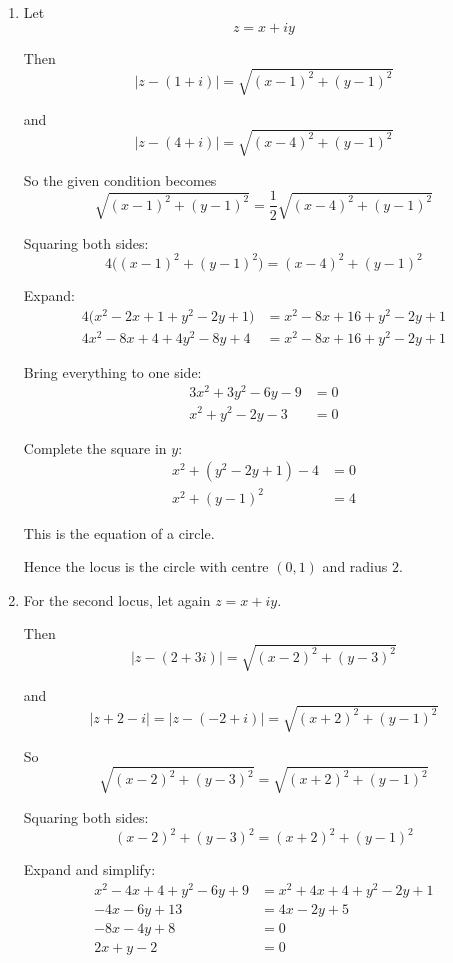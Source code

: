 \documentclass[leqno]{article}
\begin{document}
\begin{enumerate}[
  label=\textbf{\arabic*.},
  leftmargin=*,
  topsep=0pt,
  partopsep=0pt,
  parsep=0pt
]
\vspace*{10pt}

\begin{djsSolution}
\begin{enumerate}[label=\textbf{(\alph*)}]
  \item Let
  \[
  z=x+iy
  \]

  Then
  \[
  \lvert z-(1+i)\rvert=\sqrt{(x-1)^2+(y-1)^2}
  \]

  and
  \[
  \lvert z-(4+i)\rvert=\sqrt{(x-4)^2+(y-1)^2}
  \]

  So the given condition becomes
  \[
  \sqrt{(x-1)^2+(y-1)^2}=\frac12\sqrt{(x-4)^2+(y-1)^2}
  \]

  Squaring both sides:
  \[
  4\bigl((x-1)^2+(y-1)^2\bigr)=(x-4)^2+(y-1)^2
  \]

  Expand:
  \begin{align*}
  4\bigl(x^2-2x+1+y^2-2y+1\bigr)&=x^2-8x+16+y^2-2y+1\\
  4x^2-8x+4+4y^2-8y+4&=x^2-8x+16+y^2-2y+1
  \end{align*}

  Bring everything to one side:
  \begin{align*}
  3x^2+3y^2-6y-9&=0\\
  x^2+y^2-2y-3&=0
  \end{align*}

  Complete the square in $y$:
  \begin{align*}
  x^2+(y^2-2y+1)-4&=0\\
  x^2+(y-1)^2&=4
  \end{align*}

  This is the equation of a circle.

  Hence the locus is the circle with centre $(0,1)$ and radius $2$.

  \item For the second locus, let again $z=x+iy$.

  Then
  \[
  \lvert z-(2+3i)\rvert=\sqrt{(x-2)^2+(y-3)^2}
  \]

  and
  \[
  \lvert z+2-i\rvert=\lvert z-(-2+i)\rvert=\sqrt{(x+2)^2+(y-1)^2}
  \]

  So
  \[
  \sqrt{(x-2)^2+(y-3)^2}=\sqrt{(x+2)^2+(y-1)^2}
  \]

  Squaring both sides:
  \[
  (x-2)^2+(y-3)^2=(x+2)^2+(y-1)^2
  \]

  Expand and simplify:
  \begin{align*}
  x^2-4x+4+y^2-6y+9&=x^2+4x+4+y^2-2y+1\\
  -4x-6y+13&=4x-2y+5\\
  -8x-4y+8&=0\\
  2x+y-2&=0
  \end{align*}


\end{enumerate}
\end{djsSolution}
\end{enumerate}
\end{document}
